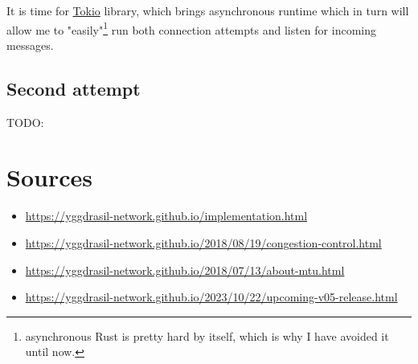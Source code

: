 \documentclass[a4paper]{article}
\begin{document}
It is time for \href{https://tokio.rs/}{Tokio} library, which brings asynchronous runtime
which in turn will allow me to "easily"\footnote{asynchronous Rust is pretty hard by itself,
  which is why I have avoided it until now.} run both connection attempts and listen for incoming messages.

\subsection{Second attempt}
TODO:

\newpage
\section*{Sources}
\begin{itemize}
  \item \url{https://yggdrasil-network.github.io/implementation.html}
  \item \url{https://yggdrasil-network.github.io/2018/08/19/congestion-control.html}
  \item \url{https://yggdrasil-network.github.io/2018/07/13/about-mtu.html}
  \item \url{https://yggdrasil-network.github.io/2023/10/22/upcoming-v05-release.html}
\end{itemize}
\end{document}
